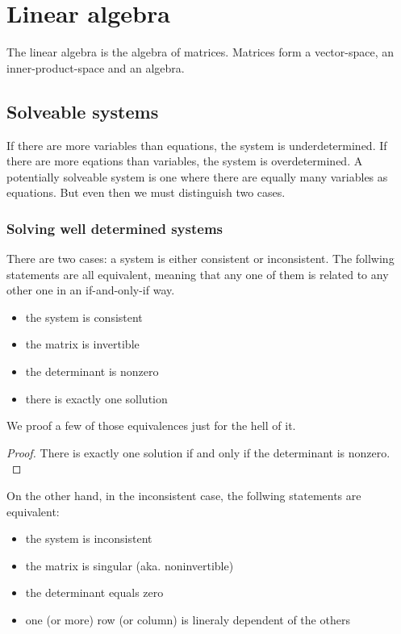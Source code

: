 \section {Linear algebra}

The linear algebra is the algebra of matrices. Matrices form a vector-space, an inner-product-space and an algebra. 


\subsection{Solveable systems}
If there are more variables than equations, the system is underdetermined. If there are more eqations than variables, the system is overdetermined. A potentially solveable system is one where there are equally many variables as equations. But even then we must distinguish two cases. 

\subsubsection{Solving well determined systems}
There are two cases: a system is either consistent or inconsistent. The follwing statements are all equivalent, meaning that any one of them is related to any other one in an if-and-only-if way. 

\begin{itemize}
    \item the system is consistent
    \item the matrix is invertible
    \item the determinant is nonzero
    \item there is exactly one sollution
\end{itemize}

We proof a few of those equivalences just for the hell of it. 

\begin{proof} There is exactly one solution if and only if the determinant is nonzero. \\
\end{proof}

On the other hand, in the inconsistent case, the follwing statements are equivalent:

\begin{itemize}
    \item the system is inconsistent
    \item the matrix is singular (aka. noninvertible)
    \item the determinant equals zero
    \item one (or more) row (or column) is lineraly dependent of the others
\end{itemize}

